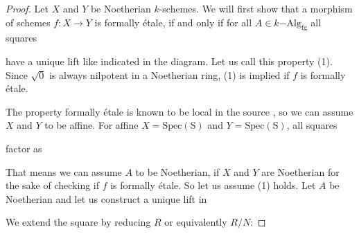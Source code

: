\documentclass{msc}
\newcommand{\fgkAlg}{\ensuremath{k\mathrm{-Alg}_{\mathrm{fg}}}}
\begin{document}
\begin{proof}
  Let $X$ and $Y$ be Noetherian $k$-schemes. 
  We will first show that a morphism of schemes $f:X\to Y$ is formally étale,
  if and only if for all $A\in\fgkAlg$ all squares
  \begin{center}
  \end{center}
  have a unique lift like indicated in the diagram. Let us call this property (1).
  Since $\sqrt{0}$ is always nilpotent in a Noetherian ring, (1) is implied if $f$ is formally étale.
  
  The property formally étale is known to be local in the source \cite[§ 17.1.6]{GrothendieckDieudonne}, so we can assume $X$ and $Y$ to be affine.
  For affine $X=\mathrm{Spec(S)}$ and $Y=\mathrm{Spec(S)}$, all squares
  \begin{center}
  \end{center}
  factor as 
  \begin{center}
  \end{center}
  That means we can assume $A$ to be Noetherian, if $X$ and $Y$ are Noetherian for the sake of checking if $f$ is formally étale.
  So let us assume (1) holds. Let $A$ be Noetherian and let us construct a unique lift in
  \begin{center}
  \end{center}
  We extend the square by reducing $R$ or equivalently $R/N$:

\end{proof}
\end{document}
